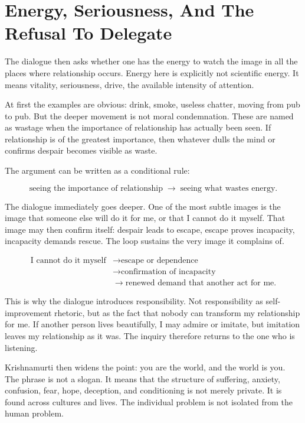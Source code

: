 \section{Energy, Seriousness, And The Refusal To Delegate}

The dialogue then asks whether one has the energy to watch the image in all the places where relationship occurs. Energy here is explicitly not scientific energy. It means vitality, seriousness, drive, the available intensity of attention.

At first the examples are obvious: drink, smoke, useless chatter, moving from pub to pub. But the deeper movement is not moral condemnation. These are named as wastage when the importance of relationship has actually been seen. If relationship is of the greatest importance, then whatever dulls the mind or confirms despair becomes visible as waste.

The argument can be written as a conditional rule:

\begin{equation}
\text{seeing the importance of relationship}
\;\longrightarrow\;
\text{seeing what wastes energy}.
\end{equation}

The dialogue immediately goes deeper. One of the most subtle images is the image that someone else will do it for me, or that I cannot do it myself. That image may then confirm itself: despair leads to escape, escape proves incapacity, incapacity demands rescue. The loop sustains the very image it complains of.

\begin{align}
\text{I cannot do it myself}
&\longrightarrow \text{escape or dependence} \\
&\longrightarrow \text{confirmation of incapacity} \\
&\longrightarrow \text{renewed demand that another act for me}.
\end{align}

This is why the dialogue introduces responsibility. Not responsibility as self-improvement rhetoric, but as the fact that nobody can transform my relationship for me. If another person lives beautifully, I may admire or imitate, but imitation leaves my relationship as it was. The inquiry therefore returns to the one who is listening.

Krishnamurti then widens the point: you are the world, and the world is you. The phrase is not a slogan. It means that the structure of suffering, anxiety, confusion, fear, hope, deception, and conditioning is not merely private. It is found across cultures and lives. The individual problem is not isolated from the human problem.

